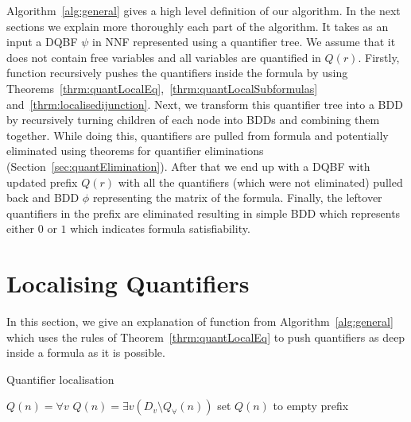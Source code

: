 \documentclass[
  digital, %
  color,
  twoside, %
  table,   %
  nolof,     %
  nolot,     %
]{fithesis3}
\theoremstyle{definition}
\theoremstyle{remark}
\newcommand{\qtlabel}[1]{l({#1})}
\newcommand{\prefix}[1]{Q({#1})}
\newcommand{\eprefix}[1]{Q_{\exists}(#1)}
\newcommand{\uprefix}[1]{Q_{\forall}(#1)}
\newcommand{\children}[1]{children({#1})}
\begin{document}
Algorithm~\ref{alg:general} gives a high level definition of our algorithm. In the next sections we explain more thoroughly each part of the algorithm. It takes as an input a DQBF $\psi$ in NNF represented using a quantifier tree. We assume that it does not contain free variables and all variables are quantified in $\prefix{r}$. Firstly, function  recursively pushes the quantifiers inside the formula by using Theorems~\ref{thrm:quantLocalEq},~\ref{thrm:quantLocalSubformulas} and~\ref{thrm:localisedijunction}. Next, we transform this quantifier tree into a BDD by recursively turning children of each node into BDDs and combining them together. While doing this, quantifiers are pulled from formula and potentially eliminated using theorems for quantifier eliminations (Section~\ref{sec:quantElimination}). After that we end up with a DQBF with updated prefix $\prefix{r}$ with all the quantifiers (which were not eliminated) pulled back and BDD $\phi$ representing the matrix of the formula. Finally, the leftover quantifiers in the prefix are eliminated resulting in simple BDD which represents either $0$ or $1$ which indicates formula satisfiability.

\section{Localising Quantifiers}
\label{sec:alglocalise}
In this section, we give an explanation of function  from Algorithm~\ref{alg:general} which uses the rules of Theorem~\ref{thrm:quantLocalEq} to push quantifiers as deep inside a formula as it is possible.

\begin{algorithm}
  \caption{Quantifier localisation}
  \label{alg:localise}
  \begin{algorithmic}[1]
      \If{$\qtlabel{n} = {\land}$}
        \State {}\label{localise:calland}
      \ElsIf{$\qtlabel{n} = {\lor}$}
        \State {}\label{localise:callor}
      \ElsIf{$\qtlabel{n} = v$ or $\qtlabel{n} = \neg v$}
        \If{$v \in \uprefix{n}$}
          \State $\prefix{n} = \forall v$
        \ElsIf{$v \in \eprefix{n}$}
          \State $\prefix{n} = \exists v(D_v \setminus \uprefix{n})$
        \Else
          \State set $\prefix{n}$ to empty prefix
        \EndIf
      \EndIf
      \ForAll{$n' \in \children{n}$}
        \State {}\label{localise:callchildren}
      \EndFor
    \EndFunction
  \end{algorithmic}
\end{algorithm}
\end{document}
